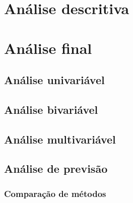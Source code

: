 \documentclass[10pt, conference, compsocconf]{IEEEtran}
\begin{document}
\lipsum[2]


\section{Análise descritiva}

\lipsum[1]

\lipsum[2]


\section{Análise final}

\lipsum[5]


\subsection{Análise univariável}

\lipsum[1]


\subsection{Análise bivariável}

\lipsum[2]


\subsection{Análise multivariável}

\lipsum[3]


\subsection{Análise de previsão}

\lipsum[4]


\subsubsection{Comparação de métodos}
\end{document}

